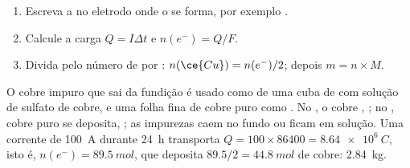 \begin{method}\label{met:g12:cells-and-electrolysis:mass}
\begin{enumerate}
  \item Escreva a  no eletrodo onde o  se forma, por
        exemplo .
  \item Calcule a carga $Q = I \Delta t$ e $n(e^-) = Q/F$.
  \item Divida pelo número de  por : $n(\ce{Cu}) =
        n(e^-)/2$; depois $m = n \times M$.
\end{enumerate}
\end{method}


\begin{example}\label{ex:g12:cells-and-electrolysis:refining}
O cobre impuro que sai da fundição é usado como  de uma cuba de
 com solução de sulfato de cobre, e uma folha fina de cobre
puro como . No , o cobre ,
; no , cobre puro se deposita,
; as impurezas caem no fundo ou ficam em
solução. Uma corrente de \qty{100}{A} durante \qty{24}{h} transporta
$Q = 100 \times 86400 = \qty{8.64e6}{C}$, isto é,
$n(e^-) = \qty{89.5}{mol}$, que deposita $89.5/2 = \qty{44.8}{mol}$ de
cobre: \qty{2.84}{kg}.
\end{example}

